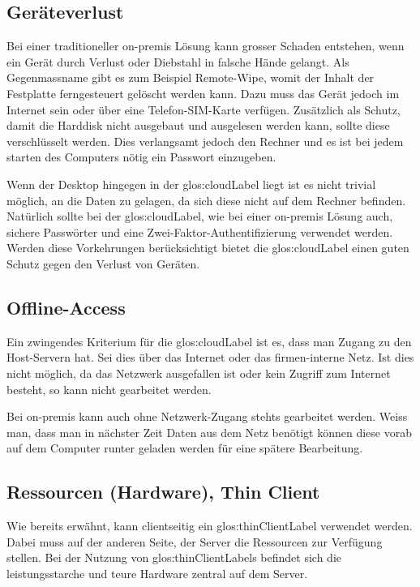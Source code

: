 \subsection{Geräteverlust}
Bei einer traditioneller on-premis Lösung kann grosser Schaden entstehen, wenn ein Gerät durch Verlust oder Diebstahl in falsche Hände gelangt.
Als Gegenmassname gibt es zum Beispiel Remote-Wipe, womit der Inhalt der Festplatte ferngesteuert gelöscht werden kann. Dazu muss das Gerät jedoch im Internet sein oder über eine Telefon-SIM-Karte verfügen.
Zusätzlich als Schutz, damit die Harddisk nicht ausgebaut und ausgelesen werden kann, sollte diese verschlüsselt werden. Dies verlangsamt jedoch den Rechner und es ist bei jedem starten des Computers nötig ein Passwort einzugeben.

Wenn der Desktop hingegen in der \Gls{glos:cloudLabel} liegt ist es nicht trivial möglich, an die Daten zu gelagen, da sich diese nicht auf dem Rechner befinden.
Natürlich sollte bei der \Gls{glos:cloudLabel}, wie bei einer on-premis Lösung auch, sichere Passwörter und eine Zwei-Faktor-Authentifizierung verwendet werden. Werden diese Vorkehrungen berücksichtigt bietet die \Gls{glos:cloudLabel} einen guten Schutz gegen den Verlust von Geräten.

\subsection{Offline-Access}
Ein zwingendes Kriterium für die \Gls{glos:cloudLabel} ist es, dass man Zugang zu den Host-Servern hat. Sei dies über das Internet oder das firmen-interne Netz. Ist dies nicht möglich, da das Netzwerk ausgefallen ist oder kein Zugriff zum Internet besteht, so kann nicht gearbeitet werden.

Bei on-premis kann auch ohne Netzwerk-Zugang stehts gearbeitet werden. Weiss man, dass man in nächster Zeit Daten aus dem Netz benötigt können diese vorab auf dem Computer runter geladen werden für eine spätere Bearbeitung.

\subsection{Ressourcen (Hardware), Thin Client}
Wie bereits erwähnt, kann clientseitig ein \gls{glos:thinClientLabel} verwendet werden. Dabei muss auf der anderen Seite, der Server die Ressourcen zur Verfügung stellen.
Bei der Nutzung von \glspl{glos:thinClientLabel} befindet sich die leistungsstarche und teure Hardware zentral auf dem Server.

